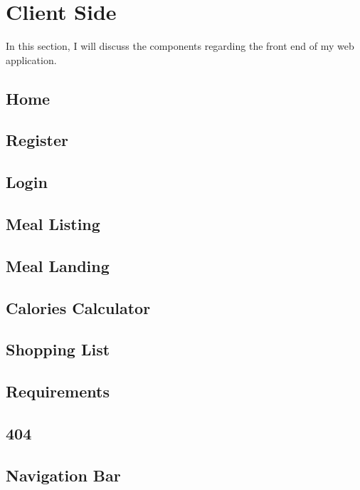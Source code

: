 \section{Client Side}

In this section, I will discuss the components regarding the front end of my web application.

\subsection{Home}

\subsection{Register}

\subsection{Login}

\subsection{Meal Listing}

\subsection{Meal Landing}

\subsection{Calories Calculator}

\subsection{Shopping List}

\subsection{Requirements}

\subsection{404}

\subsection{Navigation Bar}

